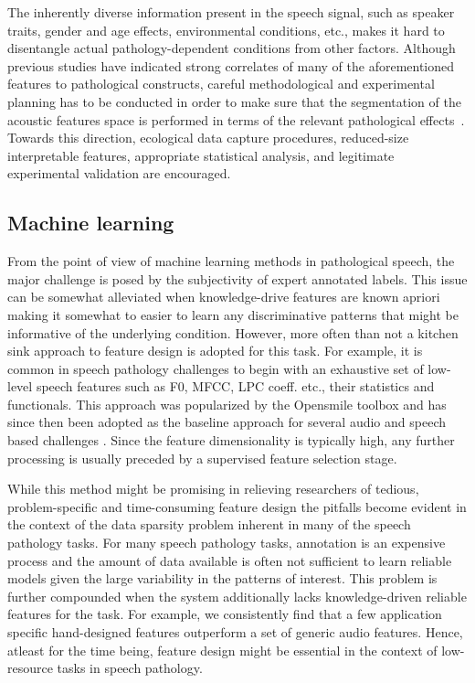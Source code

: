 \documentclass{article}
\begin{document}
The inherently diverse information present in the speech signal, such as speaker traits, gender and age effects, environmental conditions, etc., makes it hard to disentangle actual pathology-dependent conditions from other factors. Although previous studies have indicated strong correlates of many of the aforementioned features to pathological constructs, careful methodological and experimental planning has to be conducted in order to make sure that the segmentation of the acoustic features space is performed in terms of the relevant pathological effects~\cite{bone2013classifying}. Towards this direction, ecological data capture procedures, reduced-size interpretable features, appropriate statistical analysis, and legitimate experimental validation are encouraged.

\subsection{Machine learning}
From the point of view of machine learning methods in pathological speech, the major challenge is posed by the subjectivity of expert annotated labels. This issue can be somewhat alleviated when knowledge-drive features are known apriori making it somewhat to easier to learn any discriminative patterns that might be informative of the underlying condition. However, more often than not a kitchen sink approach to feature design is adopted for this task. For example, it is common in speech pathology challenges to begin with an exhaustive set of low-level speech features such as F0, MFCC, LPC coeff. etc., their statistics and functionals. This approach was popularized by the Opensmile toolbox \cite{eyben2010themunich} and has since then been adopted as the baseline approach for several audio and speech based challenges \cite{}. Since the feature dimensionality is typically high, any further processing is usually preceded by a supervised feature selection stage.

While this method might be promising in relieving researchers of tedious, problem-specific and time-consuming feature design the pitfalls become evident in the context of the data sparsity problem inherent in many of the speech pathology tasks. For many speech pathology tasks, annotation is an expensive process and the amount of data available is often not sufficient to learn reliable models given the large variability in the patterns of interest. This problem is further compounded when the system additionally lacks knowledge-driven reliable features for the task. For example, we consistently find that a few application specific hand-designed features outperform a set of generic audio features\cite{kim2013pathology}. Hence, atleast for the time being, feature design might be essential in the context of low-resource tasks in speech pathology.
\end{document}
